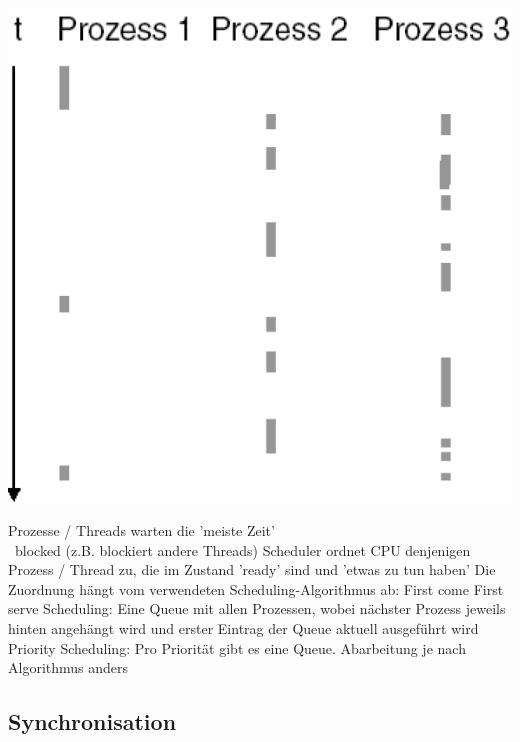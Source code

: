 \begin{minipage}[t]{0.4\columnwidth}
    \includegraphics[width=\columnwidth, align=t]{images/concurrency_quasi_parallelitaet.png}
\end{minipage}
\hfill
\begin{minipage}[t]{0.58\columnwidth}
    \raggedright
    \begin{outline}
        \1 Prozesse / Threads warten die 'meiste Zeit' \\
            \textrightarrow\ blocked (z.B.  blockiert andere Threads)
        \1 Scheduler ordnet CPU denjenigen Prozess / Thread zu, die im Zustand 'ready' sind und 'etwas zu tun haben'
        \1 Die Zuordnung hängt vom verwendeten Scheduling-Algorithmus ab:
            \2 First come First serve Scheduling: Eine Queue mit allen Prozessen, wobei nächster Prozess jeweils hinten angehängt wird und erster 
                Eintrag der Queue aktuell ausgeführt wird
            \2 Priority Scheduling: Pro Priorität gibt es eine Queue. Abarbeitung je nach Algorithmus anders
    \end{outline}
\end{minipage}


\subsection{Synchronisation}

